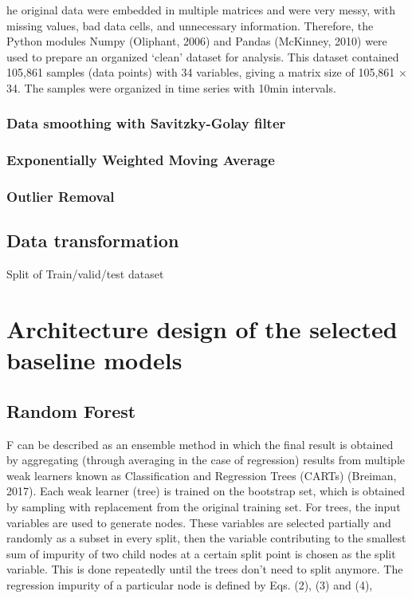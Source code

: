 he original data were embedded in multiple matrices and were very messy, with missing values, bad data cells, and unnecessary information. Therefore, the Python modules Numpy (Oliphant, 2006) and Pandas (McKinney, 2010) were used to prepare an organized ‘clean’ dataset for analysis. This dataset contained 105,861 samples (data points) with 34 variables, giving a matrix size of 105,861 × 34. The samples were organized in time series with 10min intervals.
\subsubsection{Data smoothing with Savitzky-Golay filter}
\subsubsection{Exponentially Weighted Moving Average}
\subsubsection{Outlier Removal}
\subsection{Data transformation}
Split of Train/valid/test dataset 
\section{Architecture design of the selected baseline models}
\subsection{Random Forest}
F can be described as an ensemble method in which the final result is obtained by aggregating (through averaging in the case of regression) results from multiple weak learners known as Classification and Regression Trees (CARTs) (Breiman, 2017). Each weak learner (tree) is trained on the bootstrap set, which is obtained by sampling with replacement from the original training set. For trees, the input variables are used to generate nodes. These variables are selected partially and randomly as a subset in every split, then the variable contributing to the smallest sum of impurity of two child nodes at a certain split point is chosen as the split variable. This is done repeatedly until the trees don't need to split anymore. The regression impurity of a particular node is defined by Eqs. (2), (3) and (4), \citep{wangMachineLearningFramework2021}
